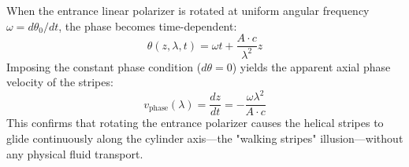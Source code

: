 \documentclass[twocolumn,10pt,a4paper]{article}
\begin{document}
When the entrance linear polarizer is rotated at uniform angular frequency $\omega = d\theta_0 / dt$, the phase becomes time-dependent:
\begin{equation}
  \theta(z, \lambda, t) = \omega t + \frac{A \cdot c}{\lambda^2} z
  \label{eq:time_dep_phase}
\end{equation}
Imposing the constant phase condition ($d\theta = 0$) yields the apparent axial phase velocity of the stripes:
\begin{equation}
  v_{\text{phase}}(\lambda) = \frac{dz}{dt} = -\frac{\omega \lambda^2}{A \cdot c}
  \label{eq:phase_velocity}
\end{equation}
This confirms that rotating the entrance polarizer causes the helical stripes to glide continuously along the cylinder axis—the "walking stripes" illusion—without any physical fluid transport.
\end{document}
